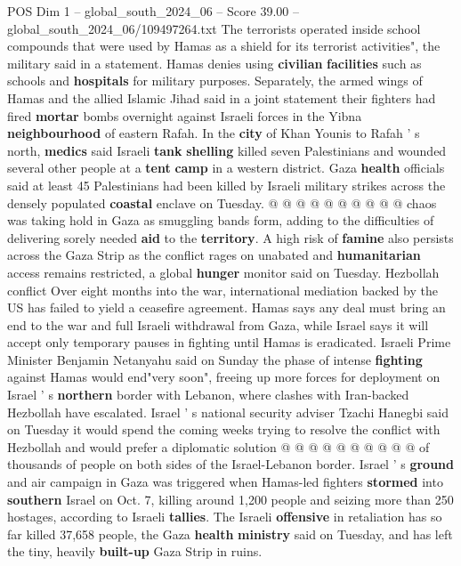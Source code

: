 \begin{textsample}{POS Dim 1 – global\_south\_2024\_06 – Score 39.00 – global\_south\_2024\_06/109497264.txt}
The terrorists operated inside school compounds that were used by Hamas as a shield for its terrorist activities", the military said in a statement.
Hamas denies using \textbf{civilian} \textbf{facilities} such as schools and \textbf{hospitals} for military purposes.
Separately, the armed wings of Hamas and the allied Islamic Jihad said in a joint statement their fighters had fired \textbf{mortar} bombs overnight against Israeli forces in the Yibna \textbf{neighbourhood} of eastern Rafah.
In the \textbf{city} of Khan Younis to Rafah ' s north, \textbf{medics} said Israeli \textbf{tank} \textbf{shelling} killed seven Palestinians and wounded several other people at a \textbf{tent} \textbf{camp} in a western district.
Gaza \textbf{health} officials said at least 45 Palestinians had been killed by Israeli military strikes across the densely populated \textbf{coastal} enclave on Tuesday. @ @ @ @ @ @ @ @ @ @ chaos was taking hold in Gaza as smuggling bands form, adding to the difficulties of delivering sorely needed \textbf{aid} to the \textbf{territory}.
A high risk of \textbf{famine} also persists across the Gaza Strip as the conflict rages on unabated and \textbf{humanitarian} access remains restricted, a global \textbf{hunger} monitor said on Tuesday.
Hezbollah conflict Over eight months into the war, international mediation backed by the US has failed to yield a ceasefire agreement.
Hamas says any deal must bring an end to the war and full Israeli withdrawal from Gaza, while Israel says it will accept only temporary pauses in fighting until Hamas is eradicated.
Israeli Prime Minister Benjamin Netanyahu said on Sunday the phase of intense \textbf{fighting} against Hamas would end"very soon", freeing up more forces for deployment on Israel ' s \textbf{northern} border with Lebanon, where clashes with Iran-backed Hezbollah have escalated.
Israel ' s national security adviser Tzachi Hanegbi said on Tuesday it would spend the coming weeks trying to resolve the conflict with Hezbollah and would prefer a diplomatic solution @ @ @ @ @ @ @ @ @ @ of thousands of people on both sides of the Israel-Lebanon border.
Israel ' s \textbf{ground} and air campaign in Gaza was triggered when Hamas-led fighters \textbf{stormed} into \textbf{southern} Israel on Oct. 7, killing around 1,200 people and seizing more than 250 hostages, according to Israeli \textbf{tallies}.
The Israeli \textbf{offensive} in retaliation has so far killed 37,658 people, the Gaza \textbf{health} \textbf{ministry} said on Tuesday, and has left the tiny, heavily \textbf{built-up} Gaza Strip in ruins.

\end{textsample}
